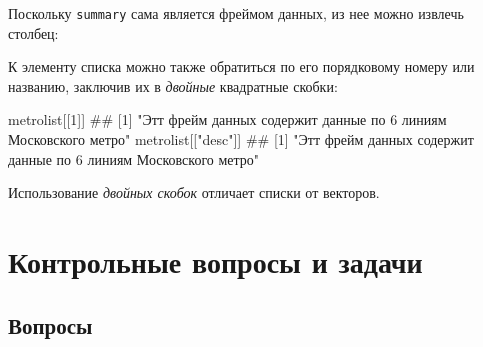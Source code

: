\documentclass[]{book}
\newenvironment{Shaded}{\begin{snugshade}}{\end{snugshade}}
\newcommand{\DecValTok}[1]{\textcolor[rgb]{0.00,0.00,0.81}{#1}}
\newcommand{\StringTok}[1]{\textcolor[rgb]{0.31,0.60,0.02}{#1}}
\newcommand{\OperatorTok}[1]{\textcolor[rgb]{0.81,0.36,0.00}{\textbf{#1}}}
\newcommand{\NormalTok}[1]{#1}
\begin{document}
Поскольку \texttt{summary} сама является фреймом данных, из нее можно
извлечь столбец:

\begin{Shaded}
\end{Shaded}

К элементу списка можно также обратиться по его порядковому номеру или
названию, заключив их в \emph{двойные} квадратные скобки:

\begin{Shaded}
\begin{Highlighting}[]
\NormalTok{metrolist[[}\DecValTok{1}\NormalTok{]]}
\NormalTok{## [1] "Этт фрейм данных содержит данные по 6 линиям Московского метро"}
\NormalTok{metrolist[[}\StringTok{"desc"}\NormalTok{]]}
\NormalTok{## [1] "Этт фрейм данных содержит данные по 6 линиям Московского метро"}
\end{Highlighting}
\end{Shaded}

Использование \emph{двойных скобок} отличает списки от векторов.

\section{Контрольные вопросы и задачи}\label{questions_tasks_matrix}

\subsection{Вопросы}\label{questions_matrix}
\end{document}
